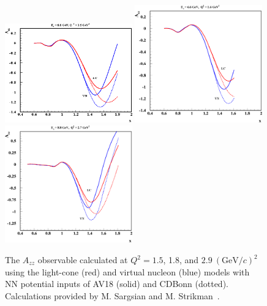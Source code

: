 \begin{figure}
\begin{center}
\includegraphics[width=0.49\textwidth]{figs/mark_misak_azz.eps}  \includegraphics[width=0.49\textwidth]{figs/h2_ratio_t20_sigma.eps}
\includegraphics[width=0.49\textwidth]{figs/h1_ratio_t20_sigma.eps}
\caption{\label{fig:misak} The $A_{zz}$ observable calculated at $Q^2=1.5$, 1.8, and $2.9~(\mathrm{GeV}/c)^2$ using the light-cone (red) and virtual nucleon (blue) models with NN potential inputs of AV18 (solid) and CDBonn (dotted). Calculations provided by M. Sargsian and M. Strikman~\cite{Sargsian:2014fla,misak-convo}.}
\end{center}
\end{figure}

